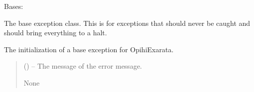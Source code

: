 \documentclass[letterpaper,11pt,english]{sphinxmanual}
\begin{document}

\begin{savenotes}\begin{fulllineitems}
\label{\detokenize{code/opihiexarata.library.error:opihiexarata.library.error.ExarataBaseException}}
\pysigstartsignatures
{}
\pysigstopsignatures
\sphinxAtStartPar
Bases: 

\sphinxAtStartPar
The base exception class. This is for exceptions that should never be
caught and should bring everything to a halt.

\begin{savenotes}\begin{fulllineitems}
\label{\detokenize{code/opihiexarata.library.error:opihiexarata.library.error.ExarataBaseException.__init__}}
\pysigstartsignatures
{}
\pysigstopsignatures
\sphinxAtStartPar
The initialization of a base exception for OpihiExarata.
\begin{quote}\begin{description}
\sphinxAtStartPar
{} () – The message of the error message.

\sphinxAtStartPar
None

\end{description}\end{quote}

\end{fulllineitems}\end{savenotes}


\end{fulllineitems}\end{savenotes}
\end{document}
